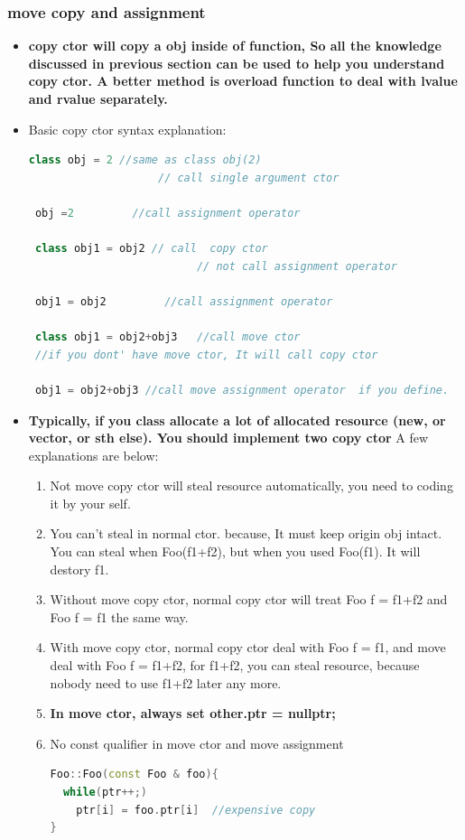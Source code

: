 \documentclass[a4paper,12pt,twoside]{book}
\begin{document}
\subsubsection{move copy and assignment }
\begin{itemize}
\item \textbf{copy ctor will copy a obj inside of function, So all the knowledge discussed in previous section can be used to help you understand copy ctor. A better method is overload function to deal with lvalue and rvalue separately. }

\item Basic copy ctor syntax explanation:
 \begin{lstlisting}[frame=single, language=c++]
 class obj = 2 //same as class obj(2)
                    // call single argument ctor

 obj =2         //call assignment operator

 class obj1 = obj2 // call  copy ctor
                          // not call assignment operator

 obj1 = obj2         //call assignment operator

 class obj1 = obj2+obj3   //call move ctor
 //if you dont' have move ctor, It will call copy ctor

 obj1 = obj2+obj3 //call move assignment operator  if you define.
\end{lstlisting}


\item \textbf{Typically, if you class allocate a lot of allocated resource (new, or vector, or sth else).  You should implement two copy ctor} A few explanations are below:

\begin{enumerate}
\item Not move copy ctor will steal resource automatically, you need to coding it by your self.
\item You can't steal in normal ctor. because, It must keep origin obj intact.  You can steal when Foo(f1+f2), but when you used Foo(f1).  It will destory f1.
\item Without  move copy ctor, normal copy ctor will treat Foo f = f1+f2 and Foo f = f1 the same way.
\item With move copy ctor, normal copy ctor deal with Foo f = f1, and move deal with Foo f = f1+f2, for f1+f2, you can steal resource, because nobody need to use f1+f2 later any more.

\item \textbf{In move ctor, always set other.ptr = nullptr;}
\item No const qualifier in move ctor and move assignment
\begin{lstlisting}[frame=single, language=c++]
Foo::Foo(const Foo & foo){
  while(ptr++;)
    ptr[i] = foo.ptr[i]  //expensive copy
}


\end{lstlisting}
\end{enumerate}
\end{itemize}
\end{document}
